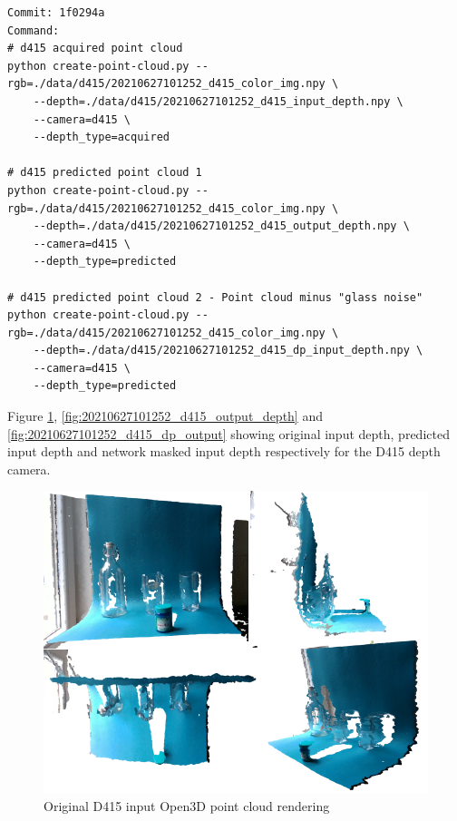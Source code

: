 \begin{verbatim}
Commit: 1f0294a
Command: 
# d415 acquired point cloud
python create-point-cloud.py --rgb=./data/d415/20210627101252_d415_color_img.npy \ 
    --depth=./data/d415/20210627101252_d415_input_depth.npy \ 
    --camera=d415 \ 
    --depth_type=acquired

# d415 predicted point cloud 1
python create-point-cloud.py --rgb=./data/d415/20210627101252_d415_color_img.npy \  
    --depth=./data/d415/20210627101252_d415_output_depth.npy \ 
    --camera=d415 \ 
    --depth_type=predicted

# d415 predicted point cloud 2 - Point cloud minus "glass noise"
python create-point-cloud.py --rgb=./data/d415/20210627101252_d415_color_img.npy \ 
    --depth=./data/d415/20210627101252_d415_dp_input_depth.npy \ 
    --camera=d415 \ 
    --depth_type=predicted
\end{verbatim}

Figure \ref{fig:20210627101252_d415_input_depth}, \ref{fig:20210627101252_d415_output_depth} and \ref{fig:20210627101252_d415_dp_output} showing original input depth, predicted input depth and network masked input depth respectively for the D415 depth camera.

\begin{figure}[h!]
\centering
\includegraphics[width=\textwidth]{Figures/20210627101252_d415_input.png}
\caption{Original D415 input Open3D point cloud rendering}
\label{fig:20210627101252_d415_input_depth}
\end{figure}

